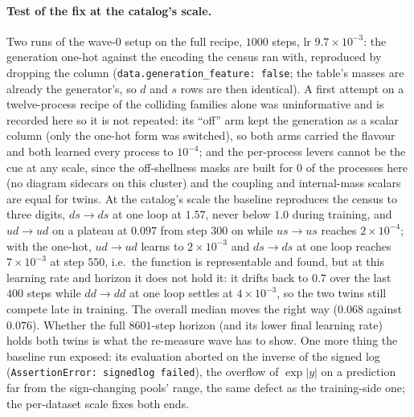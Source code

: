 \documentclass[11pt]{article}
\newcommand{\code}[1]{\texttt{#1}}
\begin{document}
\paragraph{Test of the fix at the catalog's scale.} Two runs of the wave-0 setup on the full
recipe, $1000$ steps, lr $9.7\times10^{-3}$: the generation one-hot against the encoding the
census ran with, reproduced by dropping the column (\code{data.generation\_feature: false};
the table's masses are already the generator's, so $d$ and $s$ rows are then identical). A
first attempt on a twelve-process recipe of the colliding families alone was uninformative
and is recorded here so it is not repeated: its ``off'' arm kept the generation as a scalar
column (only the one-hot form was switched), so both arms carried the flavour and both
learned every process to $10^{-4}$; and the per-process levers cannot be the cue at any
scale, since the off-shellness masks are built for $0$ of the processes here (no diagram
sidecars on this cluster) and the coupling and internal-mass scalars are equal for twins.
At the catalog's scale the baseline reproduces the census to three digits, $ds\to ds$ at one
loop at $1.57$, never below $1.0$ during training, and $ud\to ud$ on a plateau at $0.097$
from step $300$ on while $us\to us$ reaches $2\times10^{-4}$; with the one-hot, $ud\to ud$
learns to $2\times10^{-3}$ and $ds\to ds$ at one loop reaches $7\times10^{-3}$ at step
$550$, i.e.\ the function is representable and found, but at this learning rate and horizon
it does not hold it: it drifts back to $0.7$ over the last $400$ steps while $dd\to dd$ at one
loop settles at $4\times10^{-3}$, so the two twins still compete late in training. The
overall median moves the right way ($0.068$ against $0.076$). Whether the full $8601$-step horizon (and its lower final learning rate)
holds both twins is what the re-measure wave has to show. One more thing the baseline run
exposed: its evaluation aborted on the inverse of the signed log
(\code{AssertionError: signedlog failed}), the overflow of $\exp|y|$ on a prediction far
from the sign-changing pools' range, the same defect as the training-side one; the
per-dataset scale fixes both ends.
\end{document}
